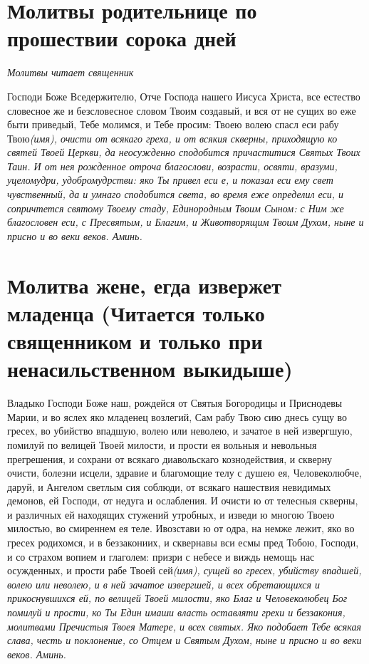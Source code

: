 \section{Молитвы родительнице по прошествии сорока дней}
 


\itshape Молитвы читает священник\normalfont{}

Господи Боже Вседержителю, Отче Господа нашего Иисуса Христа, все естество словесное же и безсловесное словом Твоим создавый, и вся от не сущих во еже быти приведый, Тебе молимся, и Тебе просим: Твоею волею спасл еси рабу Твою\itshape  (имя\normalfont{}), очисти от всякаго греха, и от всякия скверны, приходящую ко святей Твоей Церкви, да неосужденно сподобится причаститися Святых Твоих Таин. И от нея рожденное отроча благослови, возрасти, освяти, вразуми, уцеломудри, удобромудрстви: яко Ты привел еси е, и показал еси ему свет чувственный, да и умнаго сподобится света, во время еже определил еси, и сопричтется святому Твоему стаду, Единородным Твоим Сыном: с Ним же благословен еси, с Пресвятым, и Благим, и Животворящим Твоим Духом, ныне и присно и во веки веков. Аминь. 






 

\section{Молитва жене, егда извержет младенца (Читается только священником и только при ненасильственном выкидыше)}
 


Владыко Господи Боже наш, рождейся от Святыя Богородицы и Приснодевы Марии, и во яслех яко младенец возлегий, Сам рабу Твою сию днесь сущу во гресех, во убийство впадшую, волею или неволею, и зачатое в ней извергшую, помилуй по велицей Твоей милости, и прости ея вольныя и невольныя прегрешения, и сохрани от всякаго диавольскаго кознодействия, и скверну очисти, болезни исцели, здравие и благомощие телу с душею ея, Человеколюбче, даруй, и Ангелом светлым сия соблюди, от всякаго нашествия невидимых демонов, ей Господи, от недуга и ослабления. И очисти ю от телесныя скверны, и различных ей находящих стужений утробных, и изведи ю многою Твоею милостью, во смиреннем ея теле. Ивозстави ю от одра, на немже лежит, яко во гресех родихомся, и в беззакониих, и сквернавы вси есмы пред Тобою, Господи, и со страхом вопием и глаголем: призри с небесе и виждь немощь нас осужденных, и прости рабе Твоей сей\itshape  (имя\normalfont{})\itshape ,\normalfont{} сущей во гресех, убийству впадшей, волею или неволею, и в ней зачатое извергшей, и всех обретающихся и прикоснувшихся ей, по велицей Твоей милости, яко Благ и Человеколюбец Бог помилуй и прости, ко Ты Един имаши власть оставляти грехи и беззакония, молитвами Пречистыя Твоея Матере, и всех святых. Яко подобает Тебе всякая слава, честь и поклонение, со Отцем и Святым Духом, ныне и присно и во веки веков. Аминь. 


